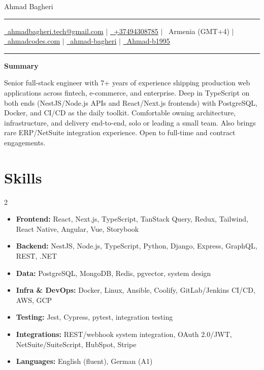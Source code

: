 \documentclass[letterpaper,10pt]{article}
\newcommand{\documentTitle}[2]{
  \begin{center}
    {\Huge\color{accentTitle} #1}
    \vspace{7pt}
    {\color{accentLine} \hrule}
    \vspace{2pt}
    \footnotesize{#2}
    \vspace{2pt}
    {\color{accentLine} \hrule}
  \end{center}
}
\newcommand{\tinysection}[1]{
  \phantomsection
  \addcontentsline{toc}{section}{#1}
  {\large{\bfseries\color{accentText}#1} {\color{accentLine} \textbar}}
}
\begin{document}
  \documentTitle{ Ahmad Bagheri }{
    \href{mailto:ahmadbagheri.tech@gmail.com}{\raisebox{-0.15\height}{\faEnvelope}~ahmadbagheri.tech@gmail.com} \quad$|$\quad
    \href{tel:+37494308785}{\raisebox{-0.15\height}{\faPhone}~+37494308785} \quad$|$\quad
    \raisebox{-0.05\height}{\faMapMarker}~Armenia (GMT+4) \quad$|$\quad
    \href{https://ahmadcodes.com}{\raisebox{-0.15\height}{\faGlobe}~ahmadcodes.com} \quad$|$\quad
    \href{https://www.linkedin.com/in/ahmad-bagheri/}{\raisebox{-0.15\height}{\faLinkedin}~ahmad-bagheri} \quad$|$\quad
    \href{https://github.com/Ahmad-b1995}{\raisebox{-0.15\height}{\faGithub}~Ahmad-b1995}
  }

  \tinysection{Summary}
  Senior full-stack engineer with 7+ years of experience shipping production web applications across fintech, e-commerce, and enterprise. Deep in TypeScript on both ends (NestJS/Node.js APIs and React/Next.js frontends) with PostgreSQL, Docker, and CI/CD as the daily toolkit. Comfortable owning architecture, infrastructure, and delivery end-to-end, solo or leading a small team. Also brings rare ERP/NetSuite integration experience. Open to full-time and contract engagements.

  \section{Skills}
  \begin{multicols}{2}
    \begin{itemize}[itemsep=-2px, parsep=1pt, leftmargin=10pt, label={}]
      \item \textbf{Frontend:} React, Next.js, TypeScript, TanStack Query, Redux, Tailwind, React Native, Angular, Vue, Storybook
      \item \textbf{Backend:} NestJS, Node.js, TypeScript, Python, Django, Express, GraphQL, REST, .NET
      \item \textbf{Data:} PostgreSQL, MongoDB, Redis, pgvector, system design
      \item \textbf{Infra \& DevOps:} Docker, Linux, Ansible, Coolify, GitLab/Jenkins CI/CD, AWS, GCP
      \item \textbf{Testing:} Jest, Cypress, pytest, integration testing
      \item \textbf{Integrations:} REST/webhook system integration, OAuth 2.0/JWT, NetSuite/SuiteScript, HubSpot, Stripe
      \item \textbf{Languages:} English (fluent), German (A1)
    \end{itemize}
  \end{multicols}
\end{document}
